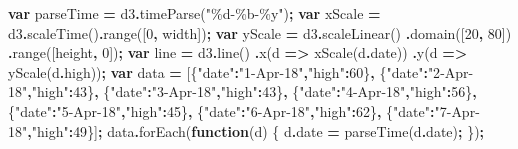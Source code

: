 \documentclass[
  openany]{book}
\newenvironment{Shaded}{\begin{snugshade}}{\end{snugshade}}
\newcommand{\AttributeTok}[1]{\textcolor[rgb]{0.77,0.63,0.00}{#1}}
\newcommand{\DecValTok}[1]{\textcolor[rgb]{0.00,0.00,0.81}{#1}}
\newcommand{\FunctionTok}[1]{\textcolor[rgb]{0.00,0.00,0.00}{#1}}
\newcommand{\KeywordTok}[1]{\textcolor[rgb]{0.13,0.29,0.53}{\textbf{#1}}}
\newcommand{\NormalTok}[1]{#1}
\newcommand{\OperatorTok}[1]{\textcolor[rgb]{0.81,0.36,0.00}{\textbf{#1}}}
\newcommand{\StringTok}[1]{\textcolor[rgb]{0.31,0.60,0.02}{#1}}
\begin{document}
\begin{Shaded}
\begin{Highlighting}[]
      \KeywordTok{var}\NormalTok{ parseTime }\OperatorTok{=}\NormalTok{ d3}\OperatorTok{.}\FunctionTok{timeParse}\NormalTok{(}\StringTok{"\%d{-}\%b{-}\%y"}\NormalTok{)}\OperatorTok{;}
      \KeywordTok{var}\NormalTok{ xScale }\OperatorTok{=}\NormalTok{ d3}\OperatorTok{.}\FunctionTok{scaleTime}\NormalTok{()}\OperatorTok{.}\FunctionTok{range}\NormalTok{([}\DecValTok{0}\OperatorTok{,}\NormalTok{ width])}\OperatorTok{;}
      \KeywordTok{var}\NormalTok{ yScale }\OperatorTok{=}\NormalTok{ d3}\OperatorTok{.}\FunctionTok{scaleLinear}\NormalTok{()}
        \OperatorTok{.}\FunctionTok{domain}\NormalTok{([}\DecValTok{20}\OperatorTok{,} \DecValTok{80}\NormalTok{])}
        \OperatorTok{.}\FunctionTok{range}\NormalTok{([height}\OperatorTok{,} \DecValTok{0}\NormalTok{])}\OperatorTok{;}
      \KeywordTok{var}\NormalTok{ line }\OperatorTok{=}\NormalTok{ d3}\OperatorTok{.}\FunctionTok{line}\NormalTok{()}
        \OperatorTok{.}\FunctionTok{x}\NormalTok{(d }\KeywordTok{=\textgreater{}}\NormalTok{ xScale(d}\OperatorTok{.}\AttributeTok{date}\NormalTok{))}
        \OperatorTok{.}\FunctionTok{y}\NormalTok{(d }\KeywordTok{=\textgreater{}}\NormalTok{ yScale(d}\OperatorTok{.}\AttributeTok{high}\NormalTok{))}\OperatorTok{;}
      \KeywordTok{var}\NormalTok{ data }\OperatorTok{=} 
\NormalTok{      [\{}\StringTok{"date"}\OperatorTok{:}\StringTok{"1{-}Apr{-}18"}\OperatorTok{,}\StringTok{"high"}\OperatorTok{:}\DecValTok{60}\NormalTok{\}}\OperatorTok{,}
\NormalTok{      \{}\StringTok{"date"}\OperatorTok{:}\StringTok{"2{-}Apr{-}18"}\OperatorTok{,}\StringTok{"high"}\OperatorTok{:}\DecValTok{43}\NormalTok{\}}\OperatorTok{,}
\NormalTok{      \{}\StringTok{"date"}\OperatorTok{:}\StringTok{"3{-}Apr{-}18"}\OperatorTok{,}\StringTok{"high"}\OperatorTok{:}\DecValTok{43}\NormalTok{\}}\OperatorTok{,}
\NormalTok{      \{}\StringTok{"date"}\OperatorTok{:}\StringTok{"4{-}Apr{-}18"}\OperatorTok{,}\StringTok{"high"}\OperatorTok{:}\DecValTok{56}\NormalTok{\}}\OperatorTok{,}
\NormalTok{      \{}\StringTok{"date"}\OperatorTok{:}\StringTok{"5{-}Apr{-}18"}\OperatorTok{,}\StringTok{"high"}\OperatorTok{:}\DecValTok{45}\NormalTok{\}}\OperatorTok{,}
\NormalTok{      \{}\StringTok{"date"}\OperatorTok{:}\StringTok{"6{-}Apr{-}18"}\OperatorTok{,}\StringTok{"high"}\OperatorTok{:}\DecValTok{62}\NormalTok{\}}\OperatorTok{,}
\NormalTok{      \{}\StringTok{"date"}\OperatorTok{:}\StringTok{"7{-}Apr{-}18"}\OperatorTok{,}\StringTok{"high"}\OperatorTok{:}\DecValTok{49}\NormalTok{\}]}\OperatorTok{;}
\NormalTok{      data}\OperatorTok{.}\FunctionTok{forEach}\NormalTok{(}\KeywordTok{function}\NormalTok{(d) \{}
\NormalTok{            d}\OperatorTok{.}\AttributeTok{date} \OperatorTok{=}\NormalTok{ parseTime(d}\OperatorTok{.}\AttributeTok{date}\NormalTok{)}\OperatorTok{;}
\NormalTok{      \})}\OperatorTok{;}
     

\end{Highlighting}
\end{Shaded}
\end{document}
